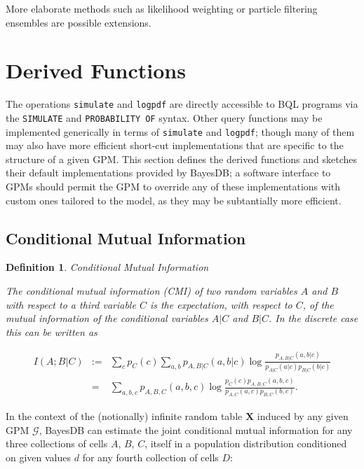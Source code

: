 \documentclass[10pt,letterpaper]{article}
\newtheorem{definition}{Definition}[section]
\newcommand{\G}{\mathcal{G}}
\begin{document}
More elaborate methods such as likelihood weighting or particle
filtering ensembles are possible extensions.

\section{Derived Functions}

The operations \texttt{simulate} and \texttt{logpdf} are directly
accessible to BQL programs via the \texttt{SIMULATE} and
\texttt{PROBABILITY OF} syntax.  Other query functions may be
implemented generically in terms of \texttt{simulate} and
\texttt{logpdf}; though many of them may also have more efficient
short-cut implementations that are specific to the structure of a
given GPM.  This section defines the derived functions and sketches
their default implementations provided by BayesDB; a software
interface to GPMs should permit the GPM to override any of these
implementations with custom ones tailored to the model, as they may be
subtantially more efficient.


\subsection{Conditional Mutual Information}

\begin{definition} Conditional Mutual Information 

The \emph{conditional mutual information} (CMI) of two random variables $A$
and $B$ with respect to a third variable $C$ is the expectation, with
respect to $C$, of the mutual information of the conditional variables
$A|C$ and $B|C$.  In the discrete case this can be written as

    \begin{eqnarray*}
    I(A;B|C) & := &
        \sum_c p_C(c) \sum_{a,b} p_{A,B|C}(a,b|c) \log
            \frac{p_{A,B|C}(a,b|c)}{p_{A|C}(a|c) p_{B|C}(b|c)} \\
    &=& \sum_{a,b,c} p_{A,B,C}(a,b,c) \log
            \frac{p_C(c) p_{A,B,C}(a,b,c)}{p_{A,C}(a,c) p_{B,C}(b,c)}.
    \end{eqnarray*}

\end{definition}

In the context of the (notionally) infinite random table $\mathbf{X}$
induced by any given GPM $\G$,
BayesDB can estimate the joint conditional mutual information for any
three collections of cells $A$, $B$, $C$, itself in a population distribution
conditioned on given values $d$ for any fourth collection of cells $D$:
\end{document}
